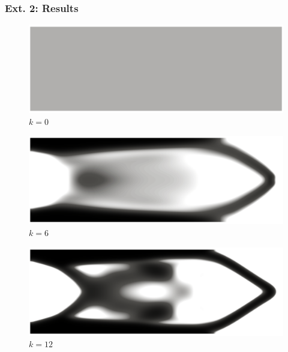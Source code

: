 \documentclass[aspectratio=169,xcolor=dvipsnames,11pt]{beamer}
\begin{document}
\begin{frame}\frametitle{Ext. 2: Results}
\begin{figure}
\centering
	\centering
	\begin{minipage}[c]{0.96\textwidth}
		\begin{minipage}[c]{0.32\textwidth}
		\small
			\centering
			\includegraphics[width=\textwidth]{Figures/TopOpt/alpha25/Cantilever0.png}
			\\[3pt]
			$k = 0$
		\end{minipage}
		\begin{minipage}[c]{0.32\textwidth}
		\small
			\centering
			\includegraphics[width=\textwidth]{Figures/TopOpt/alpha25/Cantilever6.png}
			\\[3pt]
			$k = 6$
		\end{minipage}
		\begin{minipage}[c]{0.32\textwidth}
		\small
			\centering
			\includegraphics[width=\textwidth]{Figures/TopOpt/alpha25/Cantilever12.png}
			\\[3pt]
			$k = 12$
		\end{minipage}
		\\[7pt]

\end{minipage}
\end{figure}
\end{frame}
\end{document}
